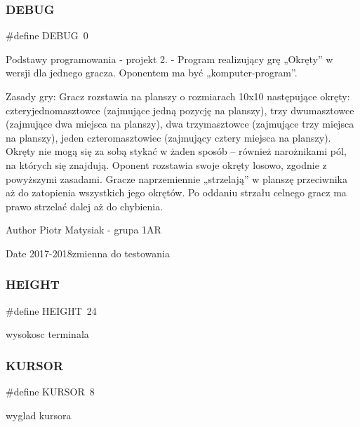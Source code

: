 \subsubsection{D\+E\+B\+UG}
{\footnotesize\ttfamily \#define D\+E\+B\+UG~0}



Podstawy programowania -\/ projekt 2. -\/ Program realizujący grę „\+Okręty” w wersji dla jednego gracza. Oponentem ma być „komputer-\/program”. 

Zasady gry\+: Gracz rozstawia na planszy o rozmiarach 10x10 następujące okręty\+: czteryjednomasztowce (zajmujące jedną pozycję na planszy), trzy dwumasztowce (zajmujące dwa miejsca na planszy), dwa trzymasztowce (zajmujące trzy miejsca na planszy), jeden czteromasztowiec (zajmujący cztery miejsca na planszy). Okręty nie mogą się za sobą stykać w żaden sposób – również narożnikami pól, na których się znajdują. Oponent rozstawia swoje okręty losowo, zgodnie z powyższymi zasadami. Gracze naprzemiennie „strzelają” w planszę przeciwnika aż do zatopienia wszystkich jego okrętów. Po oddaniu strzału celnego gracz ma prawo strzelać dalej aż do chybienia. \begin{DoxyAuthor}{Author}
Piotr Matysiak -\/ grupa 1\+AR 
\end{DoxyAuthor}
\begin{DoxyDate}{Date}
2017-\/2018zmienna do testowania 
\end{DoxyDate}
\mbox{\label{znaki_8c_aed89bd71aee8be823e8a20ec4e093c1e}} 
\subsubsection{H\+E\+I\+G\+HT}
{\footnotesize\ttfamily \#define H\+E\+I\+G\+HT~24}



wysokosc terminala 

\mbox{\label{znaki_8c_a3b0e95c317e2eba1c0943dc4ef21aef8}} 
\subsubsection{K\+U\+R\+S\+OR}
{\footnotesize\ttfamily \#define K\+U\+R\+S\+OR~8}



wyglad kursora 

